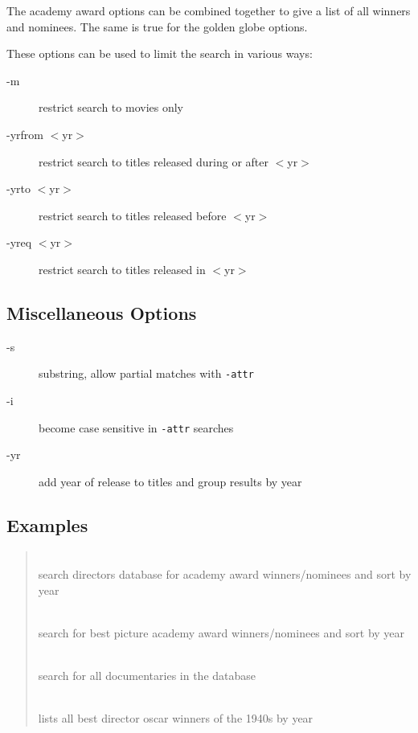 The academy award options can be combined together to give a list of all 
winners and nominees. The same is true for the golden globe options.

These options can be used to limit the search in various ways:
\begin{description}
\item[-m]                 restrict search to movies only
\item[-yrfrom $<$yr$>$]   restrict search to titles released during or 
after $<$yr$>$
\item[-yrto $<$yr$>$]     restrict search to titles released before 
$<$yr$>$
\item[-yreq $<$yr$>$]     restrict search to titles released in $<$yr$>$
\end{description}

\subsection{Miscellaneous Options}

\begin{description}
\item[-s]   substring, allow partial matches with {\tt -attr}
\item[-i]   become case sensitive in {\tt -attr} searches
\item[-yr]  add year of release to titles and group results by year
\end{description}

\subsection{Examples}

\begin{quotation}
\\
 search directors database for academy award winners/nominees and sort
 by year
 
\\
 search for best picture academy award winners/nominees and sort by year
 
\\
 search for all documentaries in the database
 
\\
 lists all best director oscar winners of the 1940s by year
\end{quotation}

